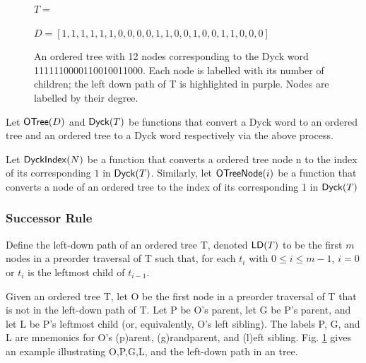 \begin{figure}
$T=$


$D=[1, 1, 1, 1, 1, 1, 0, 0, 0, 0, 1, 1, 0, 0, 1, 0, 0, 1, 1, 0, 0, 0]$
\caption{An ordered tree with 12 nodes corresponding to the Dyck word 1111110000110010011000.  Each node is labelled with its number of children; the left down path of T is highlighted in purple. Nodes are labelled by their degree.}
\label{exampleotree}
\end{figure}

Let $\mathsf{OTree}{(D)}$ and $\mathsf{Dyck}{(T)}$ be functions that convert a Dyck word to an ordered tree and an ordered tree to a Dyck word respectively via the above process. 

Let $\mathsf{DyckIndex}{(N)}$ be a function that converts a ordered tree node n to the index of its corresponding $1$ in $\mathsf{Dyck}{(T)}$. Similarly, let $\mathsf{OTreeNode}{(i)}$ be a function that converts a node of an ordered tree to the index of its corresponding 1 in $\mathsf{Dyck}{(T)}$

\subsubsection{Successor Rule}

Define the left-down path of an ordered tree T, denoted $\mathsf{LD}{(T)}$ to be the first $m$ nodes in a preorder traversal of T such that, for each $t_i$ with $0 \le i \le m-1$, $i=0$ or $t_i$ is the leftmost child of $t_{i-1}$.

Given an ordered tree T, let O be the first node in a preorder traversal of T that is not in the left-down path of T. Let P be O's parent, let G be P's parent, and let L be P's leftmost child (or, equivalently, O's left sibling).  The labels P, G, and L are mnemonics for O's (p)arent, (g)randparent, and (l)eft sibling. 
 Fig. \ref{exampleotree} gives an example illustrating O,P,G,L, and the left-down path in an tree.


